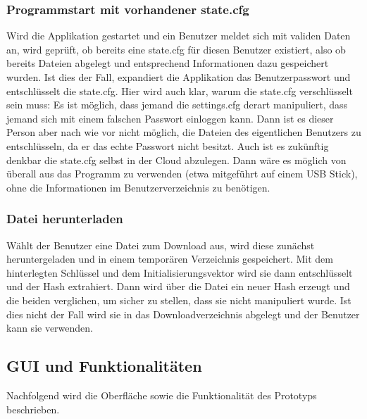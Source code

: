\documentclass[13pt,a4paper,bibliography=totocnumbered,listof=totocnumbered]{scrartcl}
\begin{document}
\subsubsection{Programmstart mit vorhandener state.cfg}
Wird die Applikation gestartet und ein Benutzer meldet sich mit validen Daten an, wird geprüft, ob bereits eine state.cfg für diesen Benutzer existiert, also ob bereits Dateien abgelegt und entsprechend Informationen dazu gespeichert wurden. Ist dies der Fall, expandiert die Applikation das Benutzerpasswort und entschlüsselt die state.cfg. Hier wird auch klar, warum die state.cfg verschlüsselt sein muss: Es ist möglich, dass jemand die settings.cfg derart manipuliert, dass jemand sich mit einem falschen Passwort einloggen kann. Dann ist es dieser Person aber nach wie vor nicht möglich, die Dateien des eigentlichen Benutzers zu entschlüsseln, da er das echte Passwort nicht besitzt. Auch ist es zukünftig denkbar die state.cfg selbst in der Cloud abzulegen. Dann wäre es möglich von überall aus das Programm zu verwenden (etwa mitgeführt auf einem USB Stick), ohne die Informationen im Benutzerverzeichnis zu benötigen.
\subsubsection{Datei herunterladen}
Wählt der Benutzer eine Datei zum Download aus, wird diese zunächst heruntergeladen und in einem temporären Verzeichnis gespeichert. Mit dem hinterlegten Schlüssel und dem Initialisierungsvektor wird sie dann entschlüsselt und der Hash extrahiert. Dann wird über die Datei ein neuer Hash erzeugt und die beiden verglichen, um sicher zu stellen, dass sie nicht manipuliert wurde. Ist dies nicht der Fall wird sie in das Downloadverzeichnis abgelegt und der Benutzer kann sie verwenden.
\pagebreak
\subsection{GUI und Funktionalitäten}\label{GUIV}
Nachfolgend wird die Oberfläche sowie die Funktionalität des Prototyps beschrieben.
\end{document}
